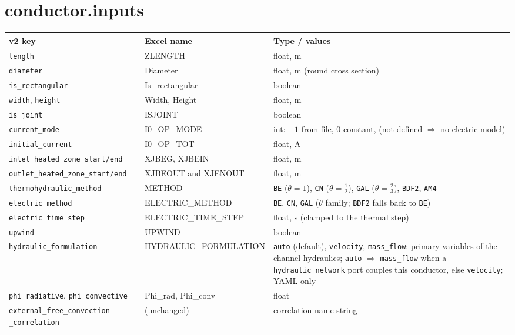\documentclass[10pt,a4paper]{article}
\newcommand{\code}[1]{\texttt{#1}}
\begin{document}
\section*{conductor.inputs}

\begin{longtable}{p{4.6cm}p{3.4cm}p{7.2cm}}
\toprule
\textbf{v2 key} & \textbf{Excel name} & \textbf{Type / values} \\
\midrule
\endhead
\code{length} & ZLENGTH & float, m \\
\code{diameter} & Diameter & float, m (round cross section) \\
\code{is\_rectangular} & Is\_rectangular & boolean \\
\code{width}, \code{height} & Width, Height & float, m \\
\code{is\_joint} & ISJOINT & boolean \\
\code{current\_mode} & I0\_OP\_MODE & int: $-1$ from file, $0$ constant, (not defined $\Rightarrow$ no electric model) \\
\code{initial\_current} & I0\_OP\_TOT & float, A \\
\code{inlet\_heated\_zone\_start/\allowbreak end} & XJBEG, XJBEIN & float, m \\
\code{outlet\_heated\_zone\_start/\allowbreak end} & XJBEOUT and XJENOUT & float, m \\
\code{thermohydraulic\_method} & METHOD & \code{BE} ($\theta{=}1$), \code{CN} ($\theta{=}\tfrac12$), \code{GAL} ($\theta{=}\tfrac23$), \code{BDF2}, \code{AM4} \\
\code{electric\_method} & ELECTRIC\_METHOD & \code{BE}, \code{CN}, \code{GAL} ($\theta$ family; \code{BDF2} falls back to \code{BE}) \\
\code{electric\_time\_step} & ELECTRIC\_TIME\_STEP & float, s (clamped to the thermal step) \\
\code{upwind} & UPWIND & boolean \\
\code{hydraulic\_formulation} & HYDRAULIC\_FORMULATION & \code{auto} (default), \code{velocity}, \code{mass\_flow}: primary variables of the channel hydraulics; \code{auto} $\Rightarrow$ \code{mass\_flow} when a \code{hydraulic\_network} port couples this conductor, else \code{velocity}; YAML-only \\
\code{phi\_radiative}, \code{phi\_convective} & Phi\_rad, Phi\_conv & float \\
\code{external\_free\_convection} \code{\_correlation} & (unchanged) & correlation name string \\
\bottomrule
\end{longtable}
\end{document}
